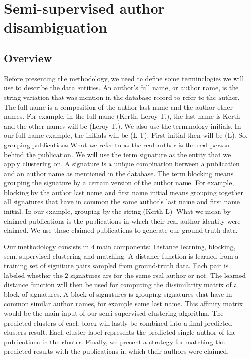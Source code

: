 \documentclass{article}
\begin{document}
\section{Semi-supervised author disambiguation}
\label{methods}

\subsection{Overview}
Before presenting the methodology, we need to define some terminologies we will use to describe the data entities. An author's full name, or author name, is the string variation that was mention in the database record to refer to the author. The full name is a composition of the author last name and the author other names. For example, in the full name (Kerth, Leroy T.), the last name is Kerth and the other names will be (Leroy T.). We also use the terminology initials. In our full name example, the initials will be (L T). First initial then will be (L). So, grouping publications  What we refer to as the real author is the real person behind the publication. We will use the term signature as the entity that we apply clustering on.  A signature is a unique combination between a publication and an author name as mentioned in the database. The term blocking means grouping the signature by a certain version of the author name. For example, blocking by the author last name and first name initial means grouping together all signatures that have in common the same author's last name and first name initial. In our example, grouping by the string (Kerth L). What we mean by claimed publications is the publications in which their real author identity were claimed. We use these claimed publications to generate our ground truth data.

Our methodology consists in 4 main components: Distance learning, blocking, semi-supervised clustering and matching. A distance function is learned from a training set of signiture pairs sampled from ground-truth data. Each pair is labeled whether the 2 signatures are for the same real author or not. The learned distance function will then be used for computing the dissimilarity matrix of a block of signatures. A block of signatures is grouping signatures that have in common similar author names, for example same last name. This affinity matrix would be the main input of our semi-supervised clustering algorithm. The predicted clusters of each block will lastly be combined into a final predicted clusters result. Each cluster label represents the predicted single author of the publications in the cluster. Finally, we present a strategy for matching the predicted results with the publications in which their authors were claimed.
\end{document}
